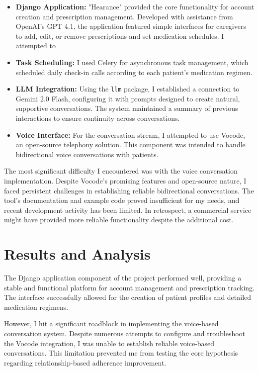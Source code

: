 \documentclass[sigconf]{acmart}
\begin{document}
\begin{itemize}
  \item \textbf{Django Application:} "Hearance" provided the core functionality for account creation and prescription management. Developed with assistance from OpenAI's GPT 4.1, the application featured simple interfaces for caregivers to add, edit, or remove prescriptions and set medication schedules.  I attempted to 
    
  \item \textbf{Task Scheduling:} I used Celery for asynchronous task management, which scheduled daily check-in calls according to each patient's medication regimen.
    
  \item \textbf{LLM Integration:} Using the  \texttt{llm} package, I established a connection to Gemini 2.0 Flash, configuring it with prompts designed to create natural, supportive conversations. The system maintained a summary of previous interactions to ensure continuity across conversations.
    
  \item \textbf{Voice Interface:} For the conversation stream, I attempted to use Vocode, an open-source telephony solution. This component was intended to handle bidirectional voice conversations with patients.
\end{itemize}

The most significant difficulty I encountered was with the voice conversation implementation. Despite Vocode's promising features and open-source nature, I faced persistent challenges in establishing reliable bidirectional conversations. The tool's documentation and example code proved insufficient for my needs, and recent development activity has been limited. In retrospect, a commercial service might have provided more reliable functionality despite the additional cost.

\section{Results and Analysis}
The Django application component of the project performed well, providing a stable and functional platform for account management and prescription tracking. The interface successfully allowed for the creation of patient profiles and detailed medication regimens.

However, I hit a significant roadblock in implementing the voice-based conversation system. Despite numerous attempts to configure and troubleshoot the Vocode integration, I was unable to establish reliable voice-based conversations. This limitation prevented me from testing the core hypothesis regarding relationship-based adherence improvement.
\end{document}
